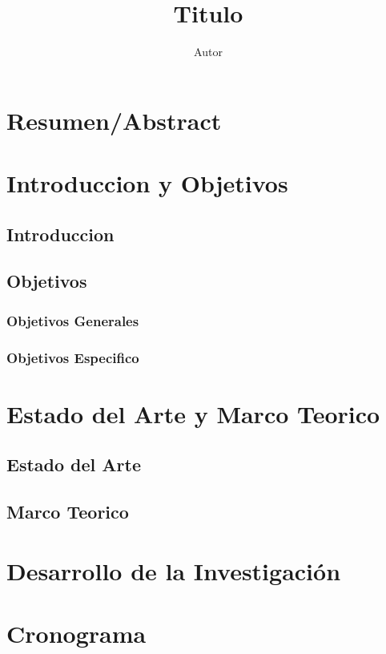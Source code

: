 \documentclass[12pt,a4paper]{article}
\author{Autor}
\title{Titulo}
\begin{document}
\nocite{*}

\tableofcontents
\section{Resumen/Abstract}
\section{Introduccion y Objetivos}
\subsection{Introduccion}
\subsection{Objetivos}
\subsubsection{Objetivos Generales}
\subsubsection{Objetivos Especifico}
\section{ Estado del Arte y Marco Teorico}
\subsection{Estado del Arte}
\subsection{Marco Teorico}
\section{Desarrollo de la Investigación}
\section{Cronograma}
\printbibliography[heading=bibintoc, 
title={Bibliografia}
]
\end{document}
